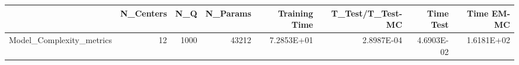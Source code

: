 \begin{tabular}{lrrrrrrr}
\toprule
{} &  N\_Centers &   N\_Q &  N\_Params &  Training Time &  T\_Test/T\_Test-MC &  Time Test &  Time EM-MC \\
\midrule
Model\_Complexity\_metrics &         12 &  1000 &     43212 &     7.2853E+01 &        2.8987E-04 & 4.6903E-02 &  1.6181E+02 \\
\bottomrule
\end{tabular}
